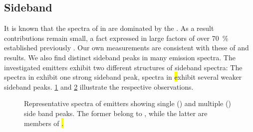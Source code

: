 	\subsection{Sideband} \label{subsubsec::sideband}

		It is known that the \pl spectra of \sivs in \nd are dominated by the \zpl. As a result \psb contributions remain small, a fact expressed in large \db factors of over \SI{70}{\percent} established previously \cite{Neu2011,Neu2011b}. Our own measurements are consistent with these of \emnarrow and \embroad results. We also find distinct sideband peaks in many \siv \pl emission spectra.
		The investigated emitters exhibit two different structures of sideband spectra: The spectra in \vl exhibit one strong sideband peak, spectra in \hl exhibit several weaker sideband peaks. \cref{subfig::sideband_group_v} and \cref{subfig::sideband_group_h} illustrate the respective observations.

		\begin{figure}[htp]
			\begin{subfigure}[t]{ 0.49\linewidth}
				\centering
				\caption{}
				\label{subfig::sideband_group_v}
			\end{subfigure}
			\hfill
			\begin{subfigure}[t]{ 0.49\linewidth}
				\centering
				\caption{}
				\label{subfig::sideband_group_h}
			\end{subfigure}
			\caption[Side band peaks for \sivs]{Representative spectra of emitters showing single () and multiple () side band peaks. The former belong to \vl, while the latter are members of \hl.}
			\label{fig::sideband_groups}
		\end{figure}

